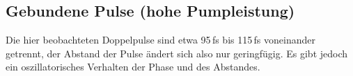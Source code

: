 \documentclass[bachelor,       %
               twoside,        %
               BCOR10mm,       %
               liststotoc,nomtotoc,bibtotoc, %
               english,ngerman, %
               final,          %
               ]{GAUBM}
\begin{document}
\subsection{Gebundene Pulse (hohe Pumpleistung)}
\label{sec:oscillatingSolitons}
Die hier beobachteten Doppelpulse sind etwa 95\,fs bis 115\,fs voneinander getrennt, der Abstand der Pulse ändert sich also nur geringfügig.
Es gibt jedoch ein oszillatorisches Verhalten der Phase und des Abstandes.
\begin{figure}[!htb]
   \centering
   \captionsetup[subfigure]{labelformat=empty}
   \captionsetup[subfloat]{farskip=-10pt,captionskip=0pt}
   \hfill
   

\end{figure}
\end{document}
